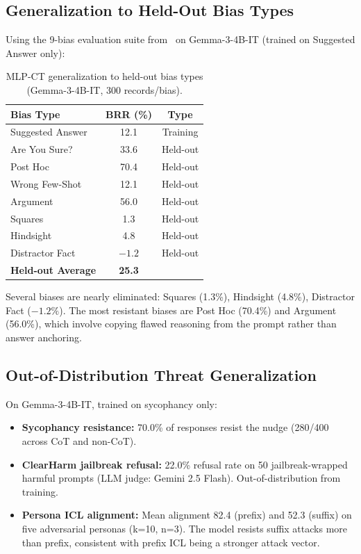 \documentclass[12pt, letterpaper]{article}
\begin{document}
\subsection{Generalization to Held-Out Bias Types}

Using the 9-bias evaluation suite from~\citet{chua2024bias} on Gemma-3-4B-IT (trained on Suggested Answer only):

\begin{table}[h]
\centering
\small
\caption{MLP-CT generalization to held-out bias types (Gemma-3-4B-IT, 300 records/bias).}
\label{tab:9bias}
\begin{tabular}{lcc}
\toprule
\textbf{Bias Type} & \textbf{BRR (\%)} & \textbf{Type} \\
\midrule
Suggested Answer & 12.1 & Training \\
\midrule
Are You Sure? & 33.6 & Held-out \\
Post Hoc & 70.4 & Held-out \\
Wrong Few-Shot & 12.1 & Held-out \\
Argument & 56.0 & Held-out \\
Squares & 1.3 & Held-out \\
Hindsight & 4.8 & Held-out \\
Distractor Fact & $-1.2$ & Held-out \\
\midrule
\textbf{Held-out Average} & \textbf{25.3} & \\
\bottomrule
\end{tabular}
\end{table}

Several biases are nearly eliminated: Squares (1.3\%), Hindsight (4.8\%), Distractor Fact ($-1.2\%$). The most resistant biases are Post Hoc (70.4\%) and Argument (56.0\%), which involve copying flawed reasoning from the prompt rather than answer anchoring.

\subsection{Out-of-Distribution Threat Generalization}

On Gemma-3-4B-IT, trained on sycophancy only:

\begin{itemize}
    \item \textbf{Sycophancy resistance:} 70.0\% of responses resist the nudge (280/400 across CoT and non-CoT).
    \item \textbf{ClearHarm jailbreak refusal:} 22.0\% refusal rate on 50 jailbreak-wrapped harmful prompts (LLM judge: Gemini 2.5 Flash). Out-of-distribution from training.
    \item \textbf{Persona ICL alignment:} Mean alignment 82.4 (prefix) and 52.3 (suffix) on five adversarial personas (k=10, n=3). The model resists suffix attacks more than prefix, consistent with prefix ICL being a stronger attack vector.
\end{itemize}
\end{document}
